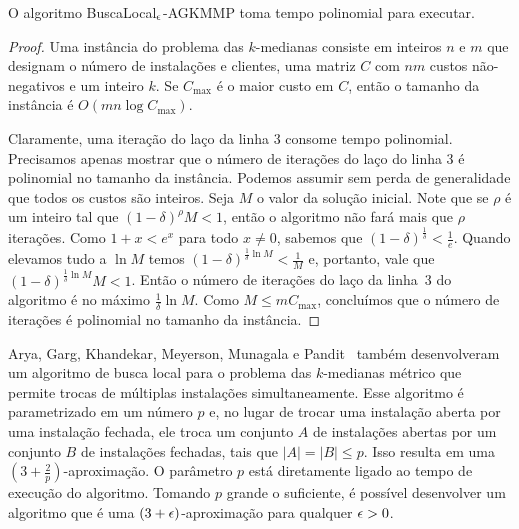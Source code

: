 \begin{theorem}
    O algoritmo {\sc BuscaLocal$_\epsilon$-AGKMMP} toma tempo polinomial para executar.
\end{theorem}
\begin{proof}
    Uma instância do problema das $k$-medianas consiste em inteiros $n$ e $m$ que designam o número de instalações e clientes, uma matriz $C$ com $nm$ custos não-negativos e um inteiro $k$. Se $C_\text{max}$ é o maior custo em $C$, então o tamanho da instância é $O(mn\log{C_\text{max}})$. 

    Claramente, uma iteração do laço da linha 3 consome tempo polinomial. Precisamos apenas mostrar que o número de iterações do laço do linha 3 é polinomial no tamanho da instância.
    Podemos assumir sem perda de generalidade que todos os custos são inteiros. Seja $M$ o valor da solução inicial. Note que se $\rho$ é um inteiro tal que $(1-\delta)^\rho M < 1$, então o algoritmo não fará mais que $\rho$ iterações. Como $ 1 + x < e^x$ para todo $x\neq 0$, sabemos que $(1 - \delta)^{\frac{1}{\delta}} < \frac{1}{e}$. Quando elevamos tudo a $\ln M$ temos $(1- \delta)^{\frac{1}{\delta}\ln M} < \frac{1}{M}$ e, portanto, vale que $ (1- \delta)^{\frac{1}{\delta}\ln M}M < 1$. Então o número de iterações do laço da linha~3 do algoritmo é no máximo $\frac{1}{\delta}\ln M$. Como $M \leq m C_\text{max}$, concluímos que o número de iterações é polinomial no tamanho da instância.
\end{proof}

Arya, Garg, Khandekar, Meyerson, Munagala e Pandit~\cite{AryaLocal} também desenvolveram um algoritmo de busca local para o problema das $k$-medianas métrico que permite trocas de múltiplas instalações simultaneamente. Esse algoritmo é parametrizado em um número $p$ e, no lugar de trocar uma instalação aberta por uma instalação fechada, ele troca um conjunto $A$ de instalações abertas por um conjunto $B$ de instalações fechadas, tais que $|A| = |B| \leq p$. Isso resulta em uma $(3 + \frac{2}{p})$-aproximação. O parâmetro $p$ está diretamente ligado ao tempo de execução do algoritmo. Tomando $p$ grande o suficiente, é possível desenvolver um algoritmo que é uma $(3+\epsilon)$-aproximação para qualquer $\epsilon >0$.